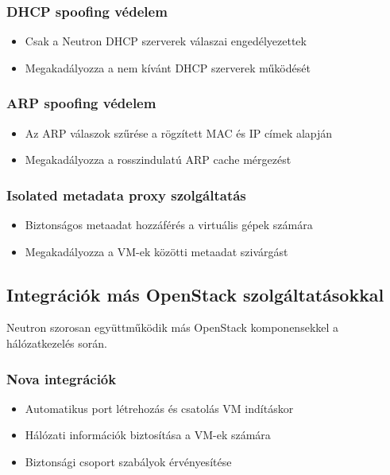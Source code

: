 \documentclass[a4paper,12pt]{article}
\begin{document}
    \subsubsection{DHCP spoofing védelem}

    \begin{itemize}
        \item Csak a Neutron DHCP szerverek válaszai engedélyezettek
        \item Megakadályozza a nem kívánt DHCP szerverek működését
    \end{itemize}

    \subsubsection{ARP spoofing védelem}

    \begin{itemize}
        \item Az ARP válaszok szűrése a rögzített MAC és IP címek alapján
        \item Megakadályozza a rosszindulatú ARP cache mérgezést
    \end{itemize}

    \subsubsection{Isolated metadata proxy szolgáltatás}

    \begin{itemize}
        \item Biztonságos metaadat hozzáférés a virtuális gépek számára
        \item Megakadályozza a VM-ek közötti metaadat szivárgást
    \end{itemize}

    \subsection{Integrációk más OpenStack szolgáltatásokkal}

    Neutron szorosan együttműködik más OpenStack komponensekkel a hálózatkezelés során.

    \subsubsection{Nova integrációk}

    \begin{itemize}
        \item Automatikus port létrehozás és csatolás VM indításkor
        \item Hálózati információk biztosítása a VM-ek számára
        \item Biztonsági csoport szabályok érvényesítése
    \end{itemize}
\end{document}
